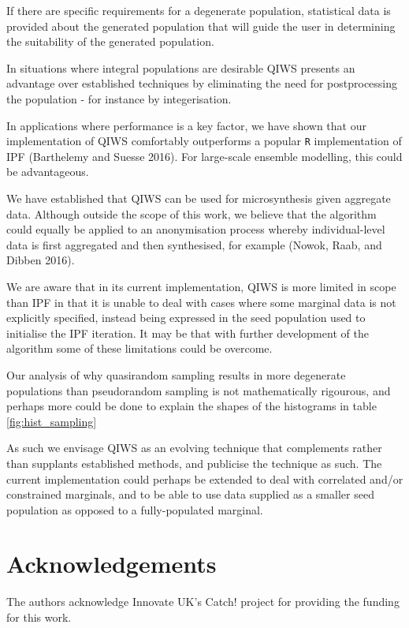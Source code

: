 \documentclass{JASSS}
\begin{document}
If there are specific requirements for a degenerate population,
statistical data is provided about the generated population that will
guide the user in determining the suitability of the generated
population.

In situations where integral populations are desirable QIWS presents an
advantage over established techniques by eliminating the need for
postprocessing the population - for instance by integerisation.

In applications where performance is a key factor, we have shown that
our implementation of QIWS comfortably outperforms a popular \texttt{R}
implementation of IPF (Barthelemy and Suesse 2016). For large-scale
ensemble modelling, this could be advantageous.

We have established that QIWS can be used for microsynthesis given
aggregate data. Although outside the scope of this work, we believe that
the algorithm could equally be applied to an anonymisation process
whereby individual-level data is first aggregated and then synthesised,
for example (Nowok, Raab, and Dibben 2016).

We are aware that in its current implementation, QIWS is more limited in scope than IPF in that it is
unable to deal with cases where some marginal data is not explicitly
specified, instead being expressed in the seed population used to
initialise the IPF iteration. It may be that with further development of
the algorithm some of these limitations could be overcome.

Our analysis of why quasirandom sampling results in more degenerate populations than pseudorandom sampling is not mathematically rigourous, and perhaps more could be done to explain the shapes of the histograms in table \ref{fig:hist_sampling}

As such we envisage QIWS as an evolving technique that complements rather than
supplants established methods, and publicise the technique as such. The current implementation could perhaps be extended to deal with correlated and/or constrained marginals, and to be able to use data supplied as a smaller seed population as opposed to a fully-populated marginal.

\section{Acknowledgements}\label{acknowledgements}

The authors acknowledge Innovate UK's Catch! project for providing the
funding for this work.
\end{document}
